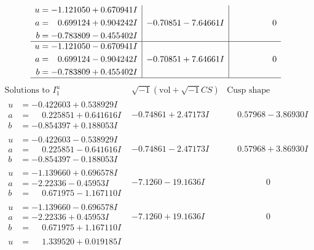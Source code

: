 \documentclass[1p]{elsarticle_modified}
\theoremstyle{definition}
\newcommand{\I}{\sqrt{-1}}
\begin{document}
$$\begin{array}{c|c|c}
\begin{aligned}
u &= -1.121050 + 0.670941 I \\
a &= \phantom{-}0.699124 + 0.904242 I \\
b &= -0.783809 - 0.455402 I\end{aligned}
 & -0.70851 - 7.64661 I & \phantom{-0.000000 } 0 \\ \hline\begin{aligned}
u &= -1.121050 - 0.670941 I \\
a &= \phantom{-}0.699124 - 0.904242 I \\
b &= -0.783809 + 0.455402 I\end{aligned}
 & -0.70851 + 7.64661 I & \phantom{-0.000000 } 0\\
 \hline 
 \end{array}$$\newpage$$\begin{array}{c|c|c}  
\text{Solutions to }I^u_{1}& \I (\text{vol} + \sqrt{-1}CS) & \text{Cusp shape}\\
 \hline 
\begin{aligned}
u &= -0.422603 + 0.538929 I \\
a &= \phantom{-}0.225851 + 0.641616 I \\
b &= -0.854397 + 0.188053 I\end{aligned}
 & -0.74861 + 2.47173 I & \phantom{-}0.57968 - 3.86930 I \\ \hline\begin{aligned}
u &= -0.422603 - 0.538929 I \\
a &= \phantom{-}0.225851 - 0.641616 I \\
b &= -0.854397 - 0.188053 I\end{aligned}
 & -0.74861 - 2.47173 I & \phantom{-}0.57968 + 3.86930 I \\ \hline\begin{aligned}
u &= -1.139660 + 0.696578 I \\
a &= -2.22336 - 0.45953 I \\
b &= \phantom{-}0.671975 - 1.167110 I\end{aligned}
 & -7.1260 - 19.1636 I & \phantom{-0.000000 } 0 \\ \hline\begin{aligned}
u &= -1.139660 - 0.696578 I \\
a &= -2.22336 + 0.45953 I \\
b &= \phantom{-}0.671975 + 1.167110 I\end{aligned}
 & -7.1260 + 19.1636 I & \phantom{-0.000000 } 0 \\ \hline\begin{aligned}
u &= \phantom{-}1.339520 + 0.019185 I \\

\end{aligned}
\end{array}$$
\end{document}
